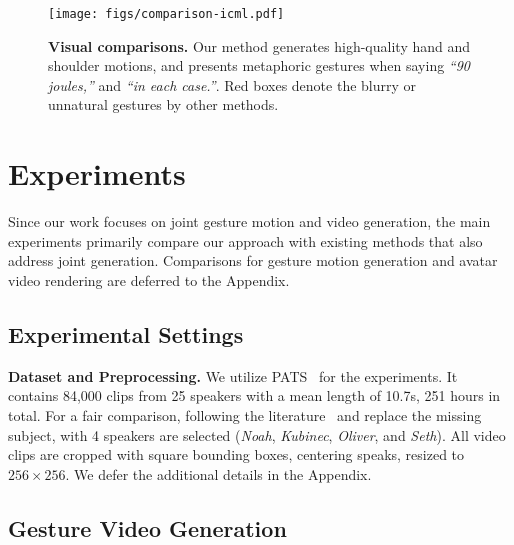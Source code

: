\begin{figure*}[t]
  \centering
   \texttt{[image: figs/comparison-icml.pdf]}
   \vspace{-0.6cm}
   \caption{\textbf{Visual comparisons.} Our method generates high-quality hand and shoulder motions, and presents metaphoric gestures when saying \textit{``90 joules,''} and \textit{``in each case.''}. Red boxes denote the blurry or unnatural gestures by other methods.}
   \label{fig:compare1}
   \vspace{-0.3cm}
\end{figure*}

\vspace{-0.2cm}
\section{Experiments}
\label{sec:exp}

\vspace{-0.2cm}
Since our work focuses on joint gesture motion and video generation, the main experiments primarily compare our approach with existing methods that also address joint generation. Comparisons for gesture motion generation and avatar video rendering are deferred to the Appendix.

\vspace{-0.2cm}
\subsection{Experimental Settings}


\textbf{Dataset and Preprocessing.}
We utilize PATS~\cite{ginosar2019gestures,ahuja2020no} for the experiments. It contains 84,000 clips from 25 speakers with a mean length of 10.7s, 251 hours in total. For a fair comparison, following the literature~\cite{angie, s2gdiffusion} and replace the missing subject, with 4 speakers are selected (\textit{Noah}, \textit{Kubinec}, \textit{Oliver}, and \textit{Seth}). All video clips are cropped with square bounding boxes, centering speaks, resized to $256\times 256$. We defer the additional details in the Appendix. 




\vspace{-0.2cm}

\subsection{Gesture Video Generation} 
\label{subsec:quantitative}

